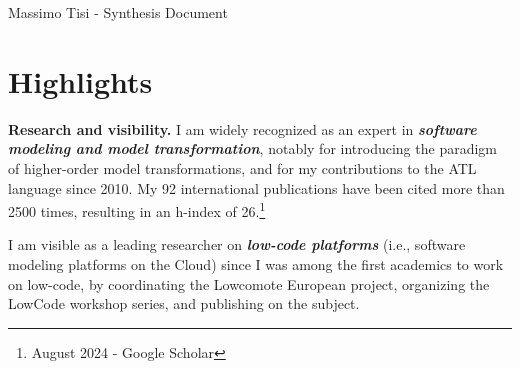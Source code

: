 \documentclass[10pt,a4paper]{article}
\def\name{Massimo Tisi}
\begin{document}
{\huge Massimo Tisi - Synthesis Document}




\section*{Highlights}

\textbf{Research and visibility.}
I am widely recognized as an expert in \textit{\textbf{software modeling and model transformation}}, notably for introducing the paradigm of higher-order model transformations, and for my contributions to the ATL language since 2010. My 92 international publications have been cited more than 2500 times, resulting in an h-index of 26.\footnote{August 2024 - Google Scholar}

I am visible as a leading researcher on  \textit{\textbf{low-code platforms}} (i.e., software modeling platforms on the Cloud) since I was among the first academics to work on low-code, by coordinating the Lowcomote European project, organizing the LowCode workshop series, and publishing on the subject. 
\end{document}
